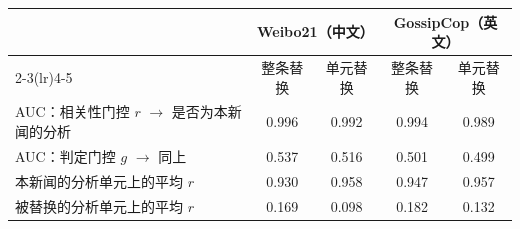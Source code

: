 \begin{tabular}{lcccc}
\toprule
 & \multicolumn{2}{c}{Weibo21（中文）} & \multicolumn{2}{c}{GossipCop（英文）} \\
\cmidrule(lr){2-3}\cmidrule(lr){4-5}
 & 整条替换 & 单元替换 & 整条替换 & 单元替换 \\
\midrule
AUC：相关性门控 $r$ $\rightarrow$ 是否为本新闻的分析 & 0.996 & 0.992 & 0.994 & 0.989 \\
AUC：判定门控 $g$ $\rightarrow$ 同上 & 0.537 & 0.516 & 0.501 & 0.499 \\
本新闻的分析单元上的平均 $r$ & 0.930 & 0.958 & 0.947 & 0.957 \\
被替换的分析单元上的平均 $r$ & 0.169 & 0.098 & 0.182 & 0.132 \\
\bottomrule
\end{tabular}
